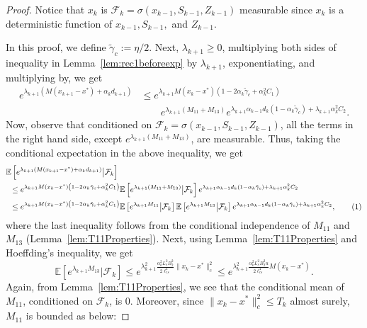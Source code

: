 \documentclass[10pt,a4paper]{amsart}
\newcommand{\E}[1]{\mathbb{E}\lrs{#1}}
\newcommand{\lcs}{\ell_{cs}}
\newcommand{\lrp}[1]{\left( #1 \right)}
\newcommand{\lrs}[1]{\left[ #1 \right]}
\newcommand{\numberthis}{\addtocounter{equation}{1}\tag{\theequation}}
\newcommand{\xk}{x_k}
\begin{document}
\begin{proof} 
    Notice that $x_k$ is $\mathcal F_k = \sigma(x_{k-1},S_{k-1}, Z_{k-1})$ measurable since $x_k$ is a deterministic function of $x_{k-1}, S_{k-1}, $ and $Z_{k-1}$.
    
    In this proof, we define $\tilde{\gamma}_c := \eta/2$. Next, $\lambda_{k+1} \ge 0$, multiplying both sides of inequality in Lemma~\ref{lem:rec1beforeexp} by $\lambda_{k+1}$, exponentiating, and multiplying by, we get
    \begin{align*}
        e^{\lambda_{k+1}\lrp{M(x_{k+1} - x^*) + \alpha_k d_{k+1}}} 
        &\le e^{\lambda_{k+1} M(\xk - x^*) \lrp{1 - 2\alpha_k\tilde{\gamma}_c + \alpha^2_k C_1 }} \\
            &\qquad e^{\lambda_{k+1} (M_{11}+M_{13})} e^{\lambda_{k+1} \alpha_{k-1}d_k (1-\alpha_k \tilde{\gamma}_c) + \lambda_{k+1}\alpha^2_k C_2}.
    \end{align*}
    Now, observe that conditioned on $\mathcal F_k = \sigma(x_{k-1}, S_{k-1}, Z_{k-1})$, all the terms in the right hand side, except $e^{\lambda_{k+1}(M_{11}+M_{13})}$, are measurable. Thus, taking the conditional expectation in the above inequality, we get
    \begin{align*}
        &\E{e^{\lambda_{k+1}\lrp{M(x_{k+1} - x^*) + \alpha_k d_{k+1}}} \big| \mathcal F_k } \\
        &\,\,\,\le e^{\lambda_{k+1}M(\xk - x^*) \lrp{1 - 2\alpha_k\tilde{\gamma}_c + \alpha^2_k C_1 }} \E{e^{\lambda_{k+1} (M_{11}+M_{13})} \big| \mathcal F_k} e^{\lambda_{k+1}\alpha_{k-1}d_k (1-\alpha_k \tilde{\gamma}_c) + \lambda_{k+1}\alpha^2_k C_2} \\
        &\,\,\, \le e^{\lambda_{k+1}M(\xk - x^*) \lrp{1 - 2\alpha_k\tilde{\gamma}_c + \alpha^2_k C_1 }} \E{e^{\lambda_{k+1} M_{11}} \big| \mathcal F_k} \E{e^{\lambda_{k+1} M_{13}} \big| \mathcal F_k} e^{\lambda_{k+1}\alpha_{k-1}d_k (1-\alpha_k \tilde{\gamma}_c) + \lambda_{k+1}\alpha^2_k C_2},\numberthis\label{eq:boundcondexp}
    \end{align*}
    where the last inequality follows from the conditional independence of $M_{11}$ and $M_{13}$ (Lemma~\ref{lem:T11Properties}). Next, using Lemma~\ref{lem:T11Properties} and Hoeffding's inequality, we get
    \[ \E{ e^{\lambda_{k+1} M_{13}} \big| \mathcal F_k} \le e^{\lambda^2_{k+1} \frac{\alpha^2_k L^2_s B^2_2}{2 \lcs^4} \|x_k - x^*\|^2_c  } \le  e^{\lambda^2_{k+1} \frac{\alpha^2_k L^2_s B^2_2 u}{2 \lcs^4} M(x_k - x^*)  }. \]
    Again, from Lemma~\ref{lem:T11Properties}, we see that the conditional mean of $M_{11}$, conditioned on $\mathcal F_k$, is $0$. Moreover, since $\|x_k-x^*\|_c^2 \leq T_k$ almost surely, $M_{11}$ is bounded as below:

\end{proof}
\end{document}
